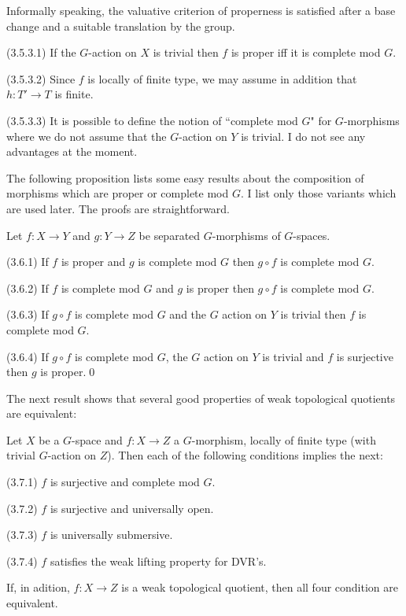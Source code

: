 Informally speaking, the valuative criterion of properness is satisfied
after a base change and a suitable translation by the group.
\enddemo

  (3.5.3.1) If the $G$-action on $X$ is trivial
then $f$  is proper  iff it is complete mod $G$.

(3.5.3.2) Since $f$ is locally of finite type, we may assume in addition that
$h:T'\to T$ is finite.

(3.5.3.3) It is possible to define the notion of ``complete mod $G$" for
$G$-morphisms where we do not assume that the $G$-action on $Y$ is trivial. I
do not see any advantages at the moment.
\enddemo

The following proposition  lists some easy results about the composition of
morphisms which are proper or complete mod $G$.  I list only those  variants
which are used later. The proofs are straightforward.

  Let $f:X\to Y$ and $g:Y\to Z$ be
separated $G$-morphisms of
$G$-spaces.

(3.6.1) If $f$ is proper and $g$ is complete mod $G$ then $g\circ f$ is
complete mod $G$.

(3.6.2) If $f$ is complete mod $G$ and $g$ is  proper then $g\circ f$ is
complete mod $G$.

(3.6.3) If $g\circ f$ is
complete mod $G$  and the $G$ action on $Y$ is trivial then
$f$ is complete mod $G$.

(3.6.4) If $g\circ f$ is
complete mod $G$, the $G$ action on $Y$ is trivial and $f$ is surjective then
$g$ is proper.\qed
\endproclaim

The next result shows that several   good properties of
weak topological quotients are equivalent:

   Let $X$ be a $G$-space and  $f:X\to Z$  a
$G$-morphism, locally  of finite type (with trivial $G$-action on $Z$). Then
each of the  following conditions implies the next:

(3.7.1) $f$  is surjective and
complete mod $G$.

(3.7.2) $f$ is surjective  and universally open.

(3.7.3) $f$ is universally submersive.

(3.7.4) $f$ satisfies the   weak lifting property for DVR's.
\smallpagebreak

If, in adition, $f:X\to Z$  is a
weak topological quotient, then all four condition are equivalent.
\endproclaim

